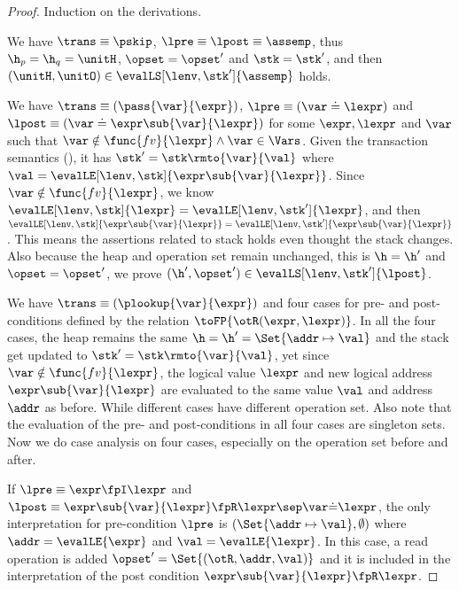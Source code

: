 \begin{proof}
Induction on the derivations.


We have \(\trans \equiv \pskip\), \( \lpre \equiv \lpost \equiv \assemp \), thus \( \h_{p} = \h_{q} = \unitH \), \( \opset = \opset' \) and \( \stk = \stk' \), and then \( (\unitH,\unitO ) \in \evalLS[\lenv, \stk']{\assemp} \) holds.


We have \(\trans \equiv ( \pass{\var}{\expr} ) \), \( \lpre \equiv ( \var \doteq \lexpr ) \) and \( \lpost \equiv ( \var \doteq \expr\sub{\var}{\lexpr} ) \) for some \( \expr, \lexpr \) and \( \var \) such that \( \var \notin \func{fv}{\lexpr} \land \var \in \Vars\).
Given the transaction semantics (), it has \( \stk' = \stk\rmto{\var}{\val} \) where \( \val = \evalLE[\lenv, \stk]{\expr\sub{\var}{\lexpr}} \).
Since \( \var \notin \func{fv}{\lexpr} \), we know \( \evalLE[\lenv, \stk]{\lexpr} = \evalLE[\lenv, \stk']{\lexpr} \), and then \( \evalLE[\lenv, \stk]{\expr\sub{\var}{\lexpr}} = \evalLE[\lenv, \stk']{\expr\sub{\var}{\lexpr}} \).
This means the assertions related to stack holds even thought the stack changes.
Also because the heap and operation set remain unchanged, this is \( \h = \h' \) and \( \opset = \opset' \), we prove \( (\h', \opset' ) \in \evalLS[\lenv, \stk']{\lpost} \).


We have  \(\trans \equiv ( \plookup{\var}{\expr} ) \) and four cases for pre- and post-conditions defined by the relation \( \toFP{\otR(\expr, \lexpr)}\).
In all the four cases, the heap remains the same \( \h = \h' = \Set{\addr \mapsto \val}\) and the stack get updated to \( \stk' = \stk\rmto{\var}{\val} \), yet since \( \var \notin \func{fv}{\lexpr}\), the logical value \( \lexpr \) and new logical address \( \expr\sub{\var}{\lexpr}\) are evaluated to the same value \( \val \) and address \( \addr \) as before.
While different cases have different operation set.
Also note that the evaluation of the pre- and post-conditions in all four cases are singleton sets.
Now we do case analysis on four cases, especially on the operation set before and after.

If \( \lpre \equiv \expr \fpI \lexpr \) and \( \lpost \equiv \expr\sub{\var}{\lexpr} \fpR \lexpr \sep \var \dot= \lexpr \), the only interpretation for pre-condition \( \lpre \) is \( (\Set{\addr \mapsto \val}, \emptyset) \) where \( \addr = \evalLE{\expr} \) and \( \val = \evalLE{\lexpr}\).
In this case, a read operation is added \( \opset' = \Set{(\otR, \addr, \val)} \) and it is included in the interpretation of the post condition  \( \expr\sub{\var}{\lexpr} \fpR \lexpr  \).


\end{proof}
